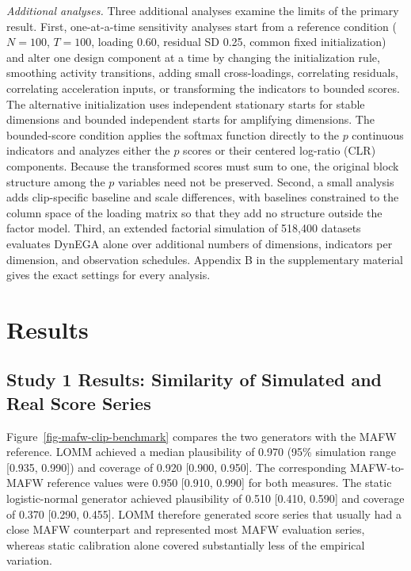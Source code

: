 \documentclass[
]{article}
\begin{document}
\emph{Additional analyses.} Three additional analyses examine the limits
of the primary result. First, one-at-a-time sensitivity analyses start
from a reference condition (\(N=100\), \(T=100\), loading 0.60, residual
SD 0.25, common fixed initialization) and alter one design component at
a time by changing the initialization rule, smoothing activity
transitions, adding small cross-loadings, correlating residuals,
correlating acceleration inputs, or transforming the indicators to
bounded scores. The alternative initialization uses independent
stationary starts for stable dimensions and bounded independent starts
for amplifying dimensions. The bounded-score condition applies the
softmax function directly to the \(p\) continuous indicators and
analyzes either the \(p\) scores or their centered log-ratio (CLR)
components. Because the transformed scores must sum to one, the original
block structure among the \(p\) variables need not be preserved. Second,
a small analysis adds clip-specific baseline and scale differences, with
baselines constrained to the column space of the loading matrix so that
they add no structure outside the factor model. Third, an extended
factorial simulation of 518,400 datasets evaluates DynEGA alone over
additional numbers of dimensions, indicators per dimension, and
observation schedules. Appendix B in the supplementary material gives
the exact settings for every analysis.

\section{Results}\label{results}

\subsection{Study 1 Results: Similarity of Simulated and Real Score
Series}\label{study-1-results-similarity-of-simulated-and-real-score-series}

Figure~\ref{fig-mafw-clip-benchmark} compares the two generators with
the MAFW reference. LOMM achieved a median plausibility of 0.970 (95\%
simulation range {[}0.935, 0.990{]}) and coverage of 0.920 {[}0.900,
0.950{]}. The corresponding MAFW-to-MAFW reference values were 0.950
{[}0.910, 0.990{]} for both measures. The static logistic-normal
generator achieved plausibility of 0.510 {[}0.410, 0.590{]} and coverage
of 0.370 {[}0.290, 0.455{]}. LOMM therefore generated score series that
usually had a close MAFW counterpart and represented most MAFW
evaluation series, whereas static calibration alone covered
substantially less of the empirical variation.
\end{document}
